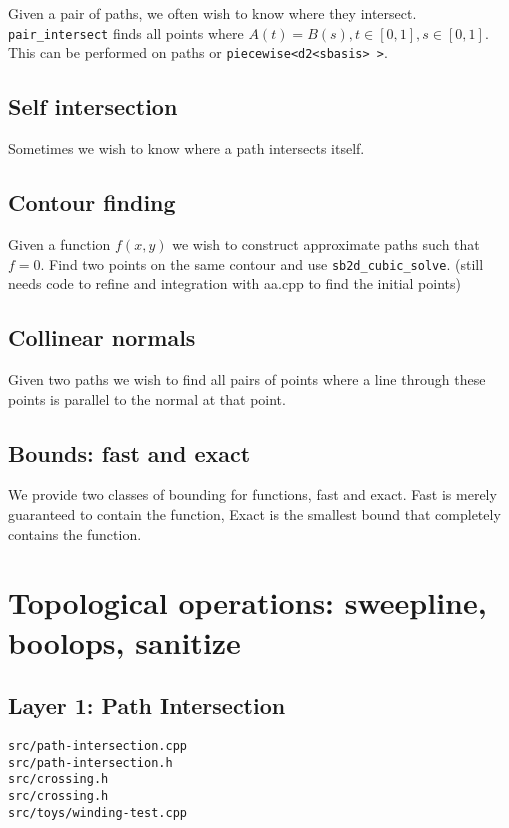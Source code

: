 \documentclass[openany]{book}
\begin{document}
Given a pair of paths, we often wish to know where they intersect.  \verb|pair_intersect| finds all points where $A(t) = B(s), t \in [0,1], s \in [0,1]$.  This can be performed on paths or \verb|piecewise<d2<sbasis> >|.

\section{Self intersection}

Sometimes we wish to know where a path intersects itself.

\section{Contour finding}

Given a function $f(x, y)$ we wish to construct approximate paths such that $f = 0$.  Find two points on the same contour and use \verb|sb2d_cubic_solve|.  (still needs code to refine and integration with aa.cpp to find the initial points)

\section{Collinear normals}

Given two paths we wish to find all pairs of points where a line through these points is parallel to the normal at that point.

\section{Bounds: fast and exact}

We provide two classes of bounding for functions, fast and exact.
Fast is merely guaranteed to contain the function, Exact is the
smallest bound that completely contains the function.

\chapter{Topological operations: sweepline, boolops, sanitize}
\section{Layer 1: Path Intersection}

\begin{verbatim}
src/path-intersection.cpp
src/path-intersection.h
src/crossing.h
src/crossing.h
src/toys/winding-test.cpp
\end{verbatim}
\end{document}
